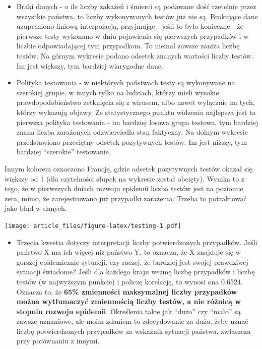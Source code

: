 \documentclass[
]{article}
\providecommand{\tightlist}{%
  \setlength{\itemsep}{0pt}\setlength{\parskip}{0pt}}
\begin{document}
\begin{itemize}
\tightlist
\item
  Braki danych - o ile liczby zakażeń i śmierci są podawane dość
  rzetelnie przez wszystkie państwa, to liczby wykonywanych testów już
  nie są. Brakujące dane uzupełniono liniową interpolacją, przyjmując -
  jeśli to było konieczne - że pierwsze testy wykonano w dniu pojawienia
  się pierwszych przypadków i w liczbie odpowiadającej tym przypadkom.
  To niemal zawsze zaniża liczbę testów. Na górnym wykresie podano
  odsetek znanych wartości liczby testów. Im jest większy, tym bardziej
  wiarygodne dane.
\item
  Polityka testowania - w niektórych państwach testy są wykonywane na
  szerokiej grupie, w innych tylko na ludziach, którzy mieli wysokie
  prawdopodobieństwo zetknięcia się z wirusem, albo nawet wyłącznie na
  tych, którzy wykazują objawy. Ze statystycznego punktu widzenia
  najlepsza jest ta pierwsza polityka testowania - im bardziej losowa
  grupa testowa, tym bardziej znana liczba zarażonych odzwierciedla stan
  faktyczny. Na dolnym wykresie przedstawiono przeciętny odsetek
  pozytywnych testów. Im jest niższy, tym bardziej ``szerokie''
  testowanie.
\end{itemize}

Innym kolorem oznaczono Francję, gdzie odsetek pozytywnych testów okazał
się większy od 1 (dla czytelności słupek na wykresie został obcięty).
Wynika to z tego, że w pierwszych dniach rozwoju epidemii liczba testów
jest na poziomie zera, mimo, że zarejestrowano już przypadki zarażenia.
Trzeba to potraktować jako błąd w danych.

\texttt{[image: article\_files/figure-latex/testing-1.pdf]}

\begin{itemize}
\tightlist
\item
  Trzecia kwestia dotyczy interpretacji liczby potwierdzonych
  przypadków. Jeśli państwo X ma ich więcej niż państwo Y, to oznacza,
  że X znajduje się w gorszej epidemicznie sytuacji, czy raczej, że
  bardziej jest swojej prawdziwej sytuacji świadome? Jeśli dla każdego
  kraju wezmę liczbę przypadków i liczbę testów (w najwyższym punkcie) i
  policzę korelację, to wynosi ona 0.6524. Oznacza to, że \textbf{65\%
  zmienności maksymalnej liczby przypadków można wytłumaczyć zmiennością
  liczby testów, a nie różnicą w stopniu rozwoju epidemii}. Określenia
  takie jak ``dużo'' czy ``mało'' są zawsze uznaniowe, ale moim zdaniem
  to zdecydowanie za dużo, żeby uznać liczbę potwierdzonych przypadków
  za wskaźnik sytuacji państwa, zwłaszcza przy porównaniu z innymi.
\end{itemize}
\end{document}
